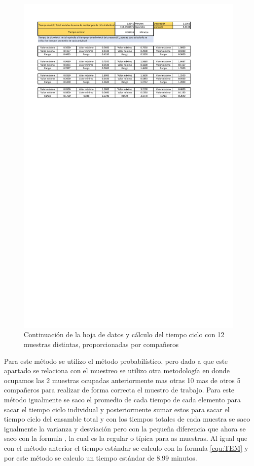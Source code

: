     \begin{figure}[H]
        \centering
        \includegraphics[trim = {10mm 300mm 10mm 20mm},clip,scale=0.34]{22/Img/tiempoEstandar12Muestras2.pdf}
        \caption{Continuación de la hoja de datos y cálculo del tiempo ciclo con 12 muestras distintas, proporcionadas por compañeros}
        \label{fig:tiempoCiclo4}
    \end{figure}
    
    Para este método se utilizo el método probabilístico, pero dado a que este apartado se relaciona con el muestreo se utilizo otra metodología en donde ocupamos las 2 muestras ocupadas anteriormente mas otras 10 mas de otros 5 compañeros para realizar de forma correcta el muestro de trabajo. Para este método igualmente se saco el promedio de cada tiempo de cada elemento para sacar el tiempo ciclo individual y posteriormente sumar estos para sacar el tiempo ciclo del ensamble total y con los tiempos totales de cada muestra se saco igualmente la varianza y desviación pero con la pequeña diferencia que ahora se saco con la formula , la cual es la regular o típica para as muestras. Al igual que con el método anterior el tiempo estándar se calculo con la formula \ref{equ:TEM} y por este método se calculo un tiempo estándar de 8.99 minutos.
    
